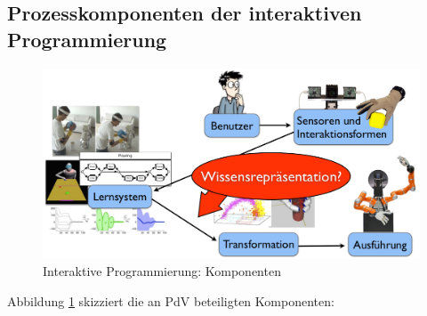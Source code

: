 \subsection{Prozesskomponenten der interaktiven Programmierung}
\begin{figure}[ht]\centering 
\includegraphics[width=0.6\linewidth]{figures/ch03_komponenten.png}
\caption{Interaktive Programmierung: Komponenten}
\label{fig:ch03_kom}
\end{figure}
Abbildung \ref{fig:ch03_kom} skizziert die an PdV beteiligten Komponenten:
